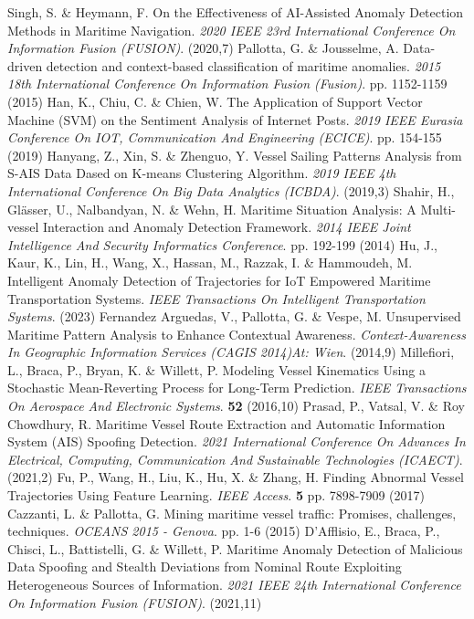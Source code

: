 Singh, S. \& Heymann, F. On the Effectiveness of AI-Assisted Anomaly Detection Methods in Maritime Navigation. {\em 2020 IEEE 23rd International Conference On Information Fusion (FUSION)}. (2020,7)
Pallotta, G. \& Jousselme, A. Data-driven detection and context-based classification of maritime anomalies. {\em 2015 18th International Conference On Information Fusion (Fusion)}. pp. 1152-1159 (2015)
Han, K., Chiu, C. \& Chien, W. The Application of Support Vector Machine (SVM) on the Sentiment Analysis of Internet Posts. {\em 2019 IEEE Eurasia Conference On IOT, Communication And Engineering (ECICE)}. pp. 154-155 (2019)
Hanyang, Z., Xin, S. \& Zhenguo, Y. Vessel Sailing Patterns Analysis from S-AIS Data Dased on K-means Clustering Algorithm. {\em 2019 IEEE 4th International Conference On Big Data Analytics (ICBDA)}. (2019,3)
Shahir, H., Glässer, U., Nalbandyan, N. \& Wehn, H. Maritime Situation Analysis: A Multi-vessel Interaction and Anomaly Detection Framework. {\em 2014 IEEE Joint Intelligence And Security Informatics Conference}. pp. 192-199 (2014)
Hu, J., Kaur, K., Lin, H., Wang, X., Hassan, M., Razzak, I. \& Hammoudeh, M. Intelligent Anomaly Detection of Trajectories for IoT Empowered Maritime Transportation Systems. {\em IEEE Transactions On Intelligent Transportation Systems}. (2023)
Fernandez Arguedas, V., Pallotta, G. \& Vespe, M. Unsupervised Maritime Pattern Analysis to Enhance Contextual Awareness. {\em Context-Awareness In Geographic Information Services (CAGIS 2014)At: Wien}. (2014,9)
Millefiori, L., Braca, P., Bryan, K. \& Willett, P. Modeling Vessel Kinematics Using a Stochastic Mean-Reverting Process for Long-Term Prediction. {\em IEEE Transactions On Aerospace And Electronic Systems}. \textbf{52} (2016,10)
Prasad, P., Vatsal, V. \& Roy Chowdhury, R. Maritime Vessel Route Extraction and Automatic Information System (AIS) Spoofing Detection. {\em 2021 International Conference On Advances In Electrical, Computing, Communication And Sustainable Technologies (ICAECT)}. (2021,2)
Fu, P., Wang, H., Liu, K., Hu, X. \& Zhang, H. Finding Abnormal Vessel Trajectories Using Feature Learning. {\em IEEE Access}. \textbf{5} pp. 7898-7909 (2017)
Cazzanti, L. \& Pallotta, G. Mining maritime vessel traffic: Promises, challenges, techniques. {\em OCEANS 2015 - Genova}. pp. 1-6 (2015)
D'Afflisio, E., Braca, P., Chisci, L., Battistelli, G. \& Willett, P. Maritime Anomaly Detection of Malicious Data Spoofing and Stealth Deviations from Nominal Route Exploiting Heterogeneous Sources of Information. {\em 2021 IEEE 24th International Conference On Information Fusion (FUSION)}. (2021,11)
